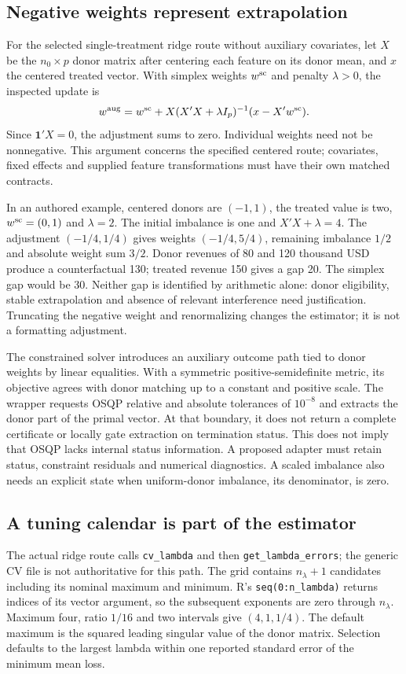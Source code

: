 \subsection{Negative weights represent extrapolation}
For the selected single-treatment ridge route without auxiliary covariates,
let $X$ be the $n_0\times p$ donor matrix after centering each feature on its
donor mean, and $x$ the centered treated vector. With simplex weights
$w^{\rm sc}$ and penalty $\lambda>0$, the inspected update is
\[
 w^{\rm aug}=w^{\rm sc}
   +X(X'X+\lambda I_p)^{-1}(x-X'w^{\rm sc}).
\]
Since $\mathbf{1}'X=0$, the adjustment sums to zero. Individual weights
need not be nonnegative. This argument concerns the specified centered
route; covariates, fixed effects and supplied feature transformations must
have their own matched contracts.\citep{exec24_augsynth_source,exec24_augsynth_choice}

In an authored example, centered donors are $(-1,1)$, the treated value is
two, $w^{\rm sc}=(0,1)$ and $\lambda=2$. The initial imbalance is one and
$X'X+\lambda=4$. The adjustment $(-1/4,1/4)$ gives weights $(-1/4,5/4)$,
remaining imbalance $1/2$ and absolute weight sum $3/2$. Donor revenues of
80 and 120 thousand USD produce a counterfactual 130; treated revenue 150
gives a gap 20. The simplex gap would be 30. Neither gap is identified by
arithmetic alone: donor eligibility, stable extrapolation and absence of
relevant interference need justification. Truncating the negative weight
and renormalizing changes the estimator; it is not a formatting adjustment.
\citep{exec24_augsynth_choice}

The constrained solver introduces an auxiliary outcome path tied to donor
weights by linear equalities. With a symmetric positive-semidefinite metric,
its objective agrees with donor matching up to a constant and positive
scale. The wrapper requests OSQP relative and absolute tolerances of
$10^{-8}$ and extracts the donor part of the primal vector. At that boundary,
it does not return a complete certificate or locally gate extraction on
termination status. This does not imply that OSQP lacks internal status
information. A proposed adapter must retain status, constraint residuals
and numerical diagnostics. A scaled imbalance also needs an explicit state
when uniform-donor imbalance, its denominator, is zero.
\citep{exec24_augsynth_source}

\subsection{A tuning calendar is part of the estimator}
The actual ridge route calls \texttt{cv\_lambda} and then
\texttt{get\_lambda\_errors}; the generic CV file is not authoritative for
this path. The grid contains $n_\lambda+1$ candidates including its nominal
maximum and minimum. R's \texttt{seq(0:n\_lambda)} returns indices of its
vector argument, so the subsequent exponents are zero through $n_\lambda$.
Maximum four, ratio $1/16$ and two intervals give $(4,1,1/4)$.
The default maximum is the squared leading singular value of the donor
matrix. Selection defaults to the largest lambda within one reported
standard error of the minimum mean loss.
\citep{exec24_augsynth_source,exec24_augsynth_choice}

